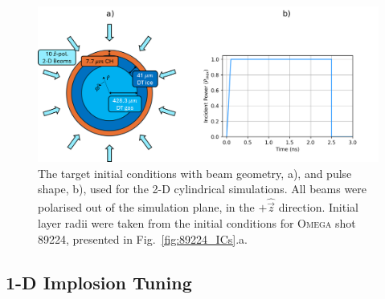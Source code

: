 \begin{figure}[t!]
    \includegraphics[width=\linewidth]{Results1/Images/cyl_setup.png}
    \centering
    \caption{The target initial conditions with beam geometry, a), and pulse shape, b), used for the 2-D cylindrical simulations.
    All beams were polarised out of the simulation plane, in the $+\hat{\vec{z}}$ direction.
    Initial layer radii were taken from the initial conditions for \textsc{Omega} shot 89224, presented in Fig.~\ref{fig:89224_ICs}.a.}%
    \label{fig:Res1_cyl_setup}
\end{figure}


\subsection{1-D Implosion Tuning}%
\label{sec:Res1_1D_tuning}

